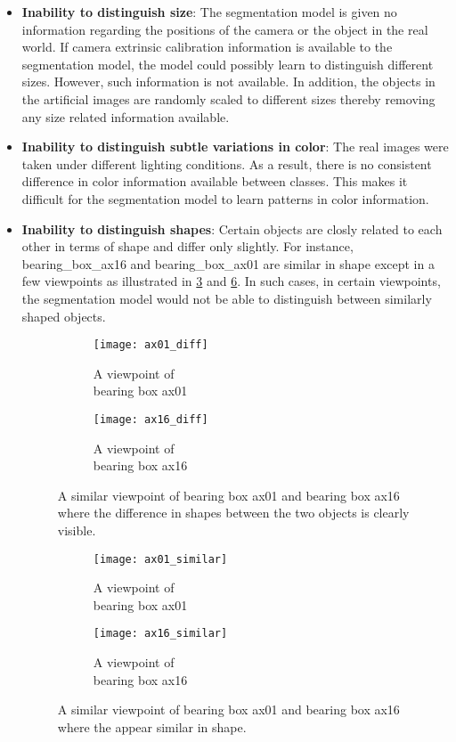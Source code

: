 \documentclass[paper=a4,11pt,parskip=half,toc=listof]{scrartcl}
\begin{document}
		\begin{itemize}
			\item \textbf{Inability to distinguish size}: The segmentation model is given no information regarding the positions of the camera or the object in the real world. If camera extrinsic calibration information is available to the segmentation model, the model could possibly learn to distinguish different sizes. However, such information is not available. In addition, the objects in the artificial images are randomly scaled to different sizes thereby removing any size related information available.
			\item \textbf{Inability to distinguish subtle variations in color}: The real images were taken under different lighting conditions. As a result, there is no consistent difference in color information available between classes. This makes it difficult for the segmentation model to learn patterns in color information.
			\item \textbf{Inability to distinguish shapes}: Certain objects are closly related to each other in terms of shape and differ only slightly. For instance, bearing\_box\_ax16 and bearing\_box\_ax01 are similar in shape except in a few viewpoints as illustrated in \ref{Fig:sim1} and \ref{Fig:sim2}. In such cases, in certain viewpoints, the segmentation model would not be able to distinguish between similarly shaped objects.
			
\begin{figure}[!htb]
	\centering
	\begin{subfigure}{.3\textwidth}
  		\centering
  		\texttt{[image: ax01\_diff]}
  		\caption{A viewpoint of \\bearing box ax01}
  		\label{Fig:sim1a}
	\end{subfigure}%
	\begin{subfigure}{.3\textwidth}
  		\centering
  		\texttt{[image: ax16\_diff]}
  		\caption{A viewpoint of \\bearing box ax16}
  		\label{Fig:sim1a}
	\end{subfigure}%
	\caption{A similar viewpoint of bearing box ax01 and bearing box ax16 where the difference in shapes between the two objects is clearly visible.}
	\label{Fig:sim1}
\end{figure}

\begin{figure}[!htb]
	\centering
	\begin{subfigure}{.3\textwidth}
  		\centering
  		\texttt{[image: ax01\_similar]}
  		\caption{A viewpoint of \\bearing box ax01}
  		\label{Fig:sim2a}
	\end{subfigure}%
	\begin{subfigure}{.3\textwidth}
  		\centering
  		\texttt{[image: ax16\_similar]}
  		\caption{A viewpoint of \\bearing box ax16}
  		\label{Fig:sim2b}
	\end{subfigure}%
	\caption{A similar viewpoint of bearing box ax01 and bearing box ax16 where the appear similar in shape.}
	\label{Fig:sim2}
\end{figure}	
	\end{itemize}
	
\end{document}
